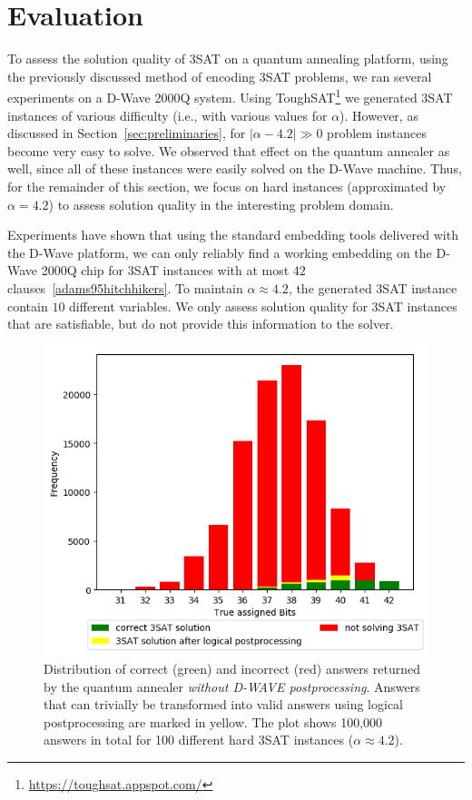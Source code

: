 
\section{Evaluation}
\label{sec:evaluation}

To assess the solution quality of 3SAT on a quantum annealing platform, using the previously discussed method of encoding 3SAT problems, we ran several experiments on a D-Wave 2000Q system. Using ToughSAT\footnote{\url{https://toughsat.appspot.com/}} we generated 3SAT instances of various difficulty (i.e., with various values for $\alpha$). However, as discussed in Section~\ref{sec:preliminaries}, for $|\alpha - 4.2| \gg 0$ problem instances become very easy to solve. We observed that effect on the quantum annealer as well, since all of these instances were easily solved on the D-Wave machine. Thus, for the remainder of this section, we focus on hard instances (approximated by $\alpha = 4.2$) to assess solution quality in the interesting problem domain.

Experiments have shown that using the standard embedding tools delivered with the D-Wave platform, we can only reliably find a working embedding on the D-Wave 2000Q chip for 3SAT instances with at most $42$ clauses~\ref{adams95hitchhikers}. To maintain $\alpha \approx 4.2$, the generated 3SAT instance contain $10$ different variables. We only assess solution quality for 3SAT instances that are satisfiable, but do not
provide this information to the solver.

\begin{figure}[t]
\centering
\includegraphics[width=.7\textwidth]{../material_2/Plots/42_4_2_def_engl_color_mit_transform.png}
\caption{Distribution of correct (green) and incorrect (red) answers returned by the quantum annealer \emph{without D-WAVE postprocessing}. Answers that can trivially be transformed into valid answers using logical postprocessing are marked in yellow. The plot shows 100,000 answers in total for 100 different hard 3SAT instances ($\alpha \approx 4.2$).}
\label{fig:distr-no-pp}
\end{figure}

